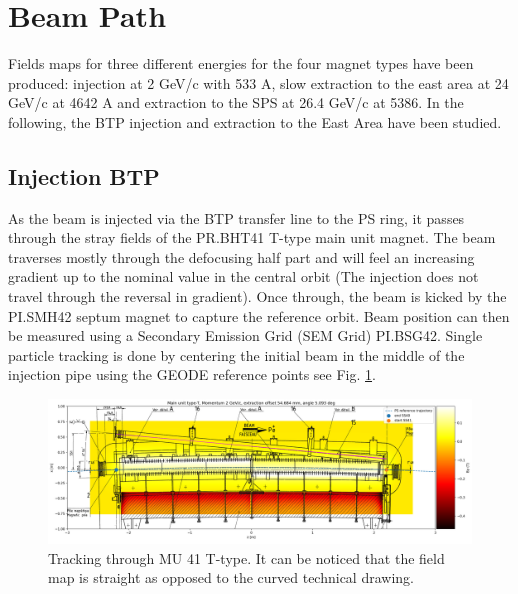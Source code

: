 \documentclass[a4paper,
               biblatex,     %
               keeplastbox,   %
               ]{jacow}
\begin{document}
\section{Beam Path}
Fields maps for three different energies for the four magnet types have been produced: injection at 2 GeV/c with 533 A, slow extraction to the east area at 24 GeV/c at 4642 A and extraction to the SPS at 26.4 GeV/c at 5386. In the following, the BTP injection and extraction to the East Area have been studied.

\subsection{Injection BTP}
As the beam is injected via the BTP transfer line to the PS ring, it passes through the stray fields of the PR.BHT41 T-type main unit magnet. The beam traverses mostly through the defocusing half part and will feel an increasing gradient up to the nominal value in the central orbit (The injection does not travel through the reversal in gradient). Once through, the beam is kicked by the PI.SMH42 septum magnet to capture the reference orbit. Beam position can then be measured using a Secondary Emission Grid (SEM Grid) PI.BSG42. Single particle tracking is done by centering the initial beam in the middle of the injection pipe using the GEODE reference points see Fig. \ref{fig:injection_btp}.

\begin{figure}[!htb]
   \centering
   \includegraphics*[width=1.0\columnwidth]{injection_btp.png}
   \caption{Tracking through MU 41 T-type. It can be noticed that the field map is straight as opposed to the curved technical drawing.}
   \label{fig:injection_btp}
\end{figure}
\end{document}
